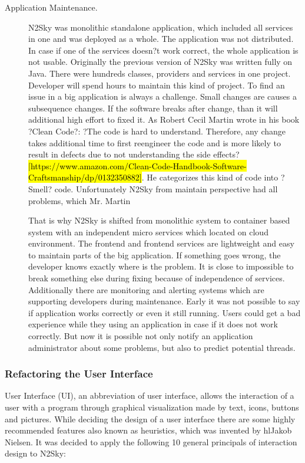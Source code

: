 \begin{description}
\item[Application Maintenance.]
N2Sky was monolithic standalone application, which included all services in one and was deployed as a whole. The application was not distributed.  In case if one of the services doesn?t work correct, the whole application is not usable. 
Originally the previous version of N2Sky was written fully on Java. There were hundreds classes, providers and services in one project. Developer will spend hours to maintain this kind of project. To find an issue in a big application is always a challenge.  Small changes are causes a subsequence changes. If the software breaks after change, than it will additional high effort to fixed it. As Robert Cecil Martin wrote in his book ?Clean Code?: ?The code is hard to understand. Therefore, any change takes additional time to first reengineer the code and is more likely to result in defects due to not understanding the side effects? \hl{[https://www.amazon.com/Clean-Code-Handbook-Software-Craftsmanship/dp/0132350882]}.  He categorizes this kind of code into ?Smell? code. Unfortunately N2Sky from maintain perspective had all problems, which Mr. Martin

That is why N2Sky is shifted from monolithic system to container based system with an independent micro services which located on cloud environment. 
The frontend and frontend services are lightweight and easy to maintain parts of the big application. If something goes wrong, the developer knows exactly where is the problem. It is close to impossible to break something else during fixing because of independence of services. 
Additionally there are monitoring and alerting systems which are supporting developers during maintenance.  Early it was not possible to say if application works correctly or even it still running. Users could get a bad experience while they using an application in case if it does not work correctly. But now it is possible not only notify an application administrator about some problems, but also to predict potential threads. 
\end{description}


\subsubsection{Refactoring the User Interface}\label{Refactoring the User Interface}

User Interface (UI), an abbreviation of user interface, allows the interaction of a user with a program through graphical visualization made by text, icons, buttons and pictures. While deciding the design of a user interface there are some highly recommended features also known as heuristics, which was invented by hl{Jakob Nielsen}. It was decided to apply the following 10 general principals of interaction design to N2Sky:

